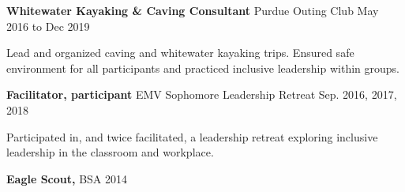 \documentclass{article}
\begin{document}
\textbf{Whitewater Kayaking \& Caving Consultant} \hfill Purdue Outing Club \hfill May 2016 to Dec 2019\\
\vspace{-12pt}
\begin{adjustwidth}{20pt}{}
Lead and organized caving and whitewater kayaking trips. Ensured safe environment for all participants and practiced inclusive leadership within groups.\\
\end{adjustwidth}
\vspace{-9pt}
\textbf{Facilitator, participant} \hfill EMV Sophomore Leadership Retreat \hfill Sep. 2016, 2017, 2018\\
\vspace{-12pt}
\begin{adjustwidth}{20pt}{}
Participated in, and twice facilitated, a leadership retreat exploring inclusive leadership in the classroom and workplace.
\end{adjustwidth}
\textbf{Eagle Scout,} BSA \hfill 2014\\
\end{document}
